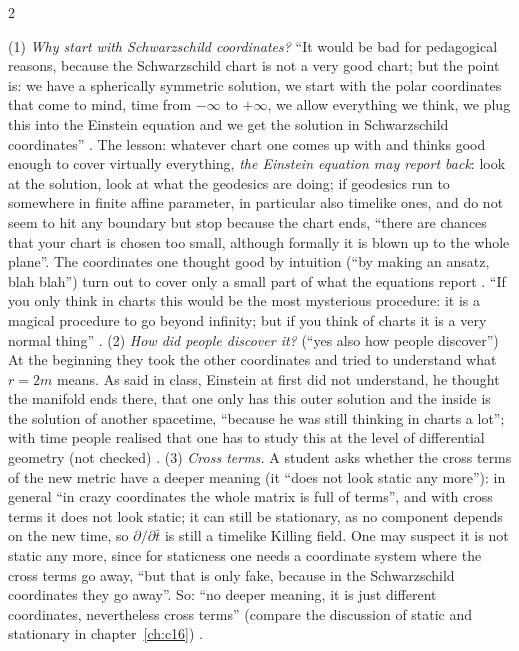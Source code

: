 \begin{paracol}{2}
\begin{coursenote}
(1) \emph{Why start with Schwarzschild coordinates?} ``It would be bad for pedagogical reasons, because the Schwarzschild chart is not a very good chart; but the point is: we have a spherically symmetric solution, we start with the polar coordinates that come to mind, time from $-\infty$ to $+\infty$, we allow everything we think, we plug this into the Einstein equation and we get the solution in Schwarzschild coordinates'' . The lesson: whatever chart one comes up with and thinks good enough to cover virtually everything, \emph{the Einstein equation may report back}: look at the solution, look at what the geodesics are doing; if geodesics run to somewhere in finite affine parameter, in particular also timelike ones, and do not seem to hit any boundary but stop because the chart ends, ``there are chances that your chart is chosen too small, although formally it is blown up to the whole plane''. The coordinates one thought good by intuition (``by making an ansatz, blah blah'') turn out to cover only a small part of what the equations report . ``If you only think in charts this would be the most mysterious procedure: it is a magical procedure to go beyond infinity; but if you think of charts it is a very normal thing'' .
(2) \emph{How did people discover it?} (``yes also how people discover'') At the beginning they took the other coordinates and tried to understand what $r=2m$ means. As said in class, Einstein at first did not understand, he thought the manifold ends there, that one only has this outer solution and the inside is the solution of another spacetime, ``because he was still thinking in charts a lot''; with time people realised that one has to study this at the level of differential geometry (not checked) .
(3) \emph{Cross terms.} A student asks whether the cross terms of the new metric have a deeper meaning (it ``does not look static any more''): in general ``in crazy coordinates the whole matrix is full of terms'', and with cross terms it does not look static; it can still be stationary, as no component depends on the new time, so $\partial/\partial\bar t$ is still a timelike Killing field. One may suspect it is not static any more, since for staticness one needs a coordinate system where the cross terms go away, ``but that is only fake, because in the Schwarzschild coordinates they go away''. So: ``no deeper meaning, it is just different coordinates, nevertheless cross terms'' (compare the discussion of static and stationary in chapter~\ref{ch:c16}) .
\end{coursenote}


\end{paracol}
